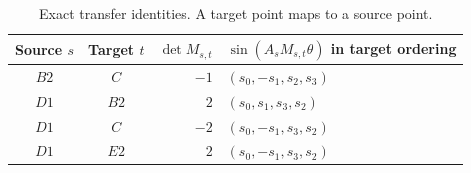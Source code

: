 \begin{table}[htbp]
\centering
\begin{tabular}{ccrl}
\toprule
Source $s$ & Target $t$ & $\det M_{s,t}$ & $\sin(A_sM_{s,t}\theta)$ in target ordering\\
\midrule
$B2$ & $C$ & $-1$ & $(s_0,-s_1,s_2,s_3)$\\
$D1$ & $B2$ & $2$ & $(s_0,s_1,s_3,s_2)$\\
$D1$ & $C$ & $-2$ & $(s_0,-s_1,s_3,s_2)$\\
$D1$ & $E2$ & $2$ & $(s_0,-s_1,s_3,s_2)$\\
\bottomrule
\end{tabular}
\caption{Exact transfer identities. A target point maps to a source point.}\label{tab:transport}
\end{table}
